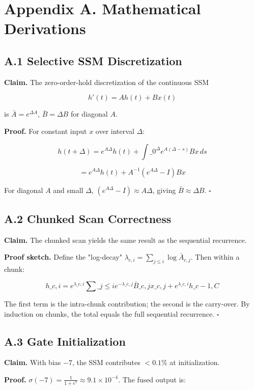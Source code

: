 
\section{Appendix A. Mathematical Derivations}

\subsection{A.1 Selective SSM Discretization}

\textbf{Claim.} The zero-order-hold discretization of the continuous SSM

\[
h'(t) = A h(t) + B x(t)
\tag{A.1}
\]

is $\bar{A} = e^{\Delta A}$, $\bar{B} = \Delta B$ for diagonal $A$.

\textbf{Proof.} For constant input $x$ over interval $\Delta$:

\[
h(t + \Delta) = e^{A \Delta} h(t) + \int\_0^\Delta e^{A(\Delta - s)} B x \, ds
\]

\[
= e^{A \Delta} h(t) + A^{-1}(e^{A \Delta} - I) B x
\]

For diagonal $A$ and small $\Delta$, $(e^{A\Delta} - I) \approx A \Delta$, 
giving $\bar{B} \approx \Delta B$. $\square$

\subsection{A.2 Chunked Scan Correctness}

\textbf{Claim.} The chunked scan yields the same result as the sequential 
recurrence.

\textbf{Proof sketch.} Define the "log-decay" $\lambda_{c, i} = \sum_{j \leq i} \log \bar{A}_{c, j}$. 
Then within a chunk:

\[
h\_{c, i} = e^{\lambda\_{c, i}} \sum\_{j \leq i} e^{-\lambda\_{c, j}} \bar{B}\_{c, j} x\_{c, j} + e^{\lambda\_{c, i}} h\_{c-1, C}
\]

The first term is the intra-chunk contribution; the second is the carry-over. 
By induction on chunks, the total equals the full sequential recurrence. $\square$

\subsection{A.3 Gate Initialization}

\textbf{Claim.} With bias $-7$, the SSM contributes $< 0.1\%$ at initialization.

\textbf{Proof.} $\sigma(-7) = \frac{1}{1 + e^7} \approx 9.1 \times 10^{-4}$. The 
fused output is:

